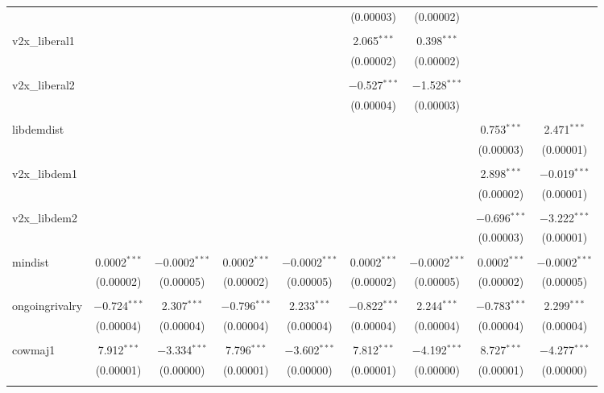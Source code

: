 \begin{table}[!htbp]
\begin{tabular}{@{\extracolsep{5pt}}lcccccccc}
  &  &  &  &  & (0.00003) & (0.00002) &  &  \\ 
  & & & & & & & & \\ 
 v2x\_liberal1 &  &  &  &  & 2.065$^{***}$ & 0.398$^{***}$ &  &  \\ 
  &  &  &  &  & (0.00002) & (0.00002) &  &  \\ 
  & & & & & & & & \\ 
 v2x\_liberal2 &  &  &  &  & $-$0.527$^{***}$ & $-$1.528$^{***}$ &  &  \\ 
  &  &  &  &  & (0.00004) & (0.00003) &  &  \\ 
  & & & & & & & & \\ 
 libdemdist &  &  &  &  &  &  & 0.753$^{***}$ & 2.471$^{***}$ \\ 
  &  &  &  &  &  &  & (0.00003) & (0.00001) \\ 
  & & & & & & & & \\ 
 v2x\_libdem1 &  &  &  &  &  &  & 2.898$^{***}$ & $-$0.019$^{***}$ \\ 
  &  &  &  &  &  &  & (0.00002) & (0.00001) \\ 
  & & & & & & & & \\ 
 v2x\_libdem2 &  &  &  &  &  &  & $-$0.696$^{***}$ & $-$3.222$^{***}$ \\ 
  &  &  &  &  &  &  & (0.00003) & (0.00001) \\ 
  & & & & & & & & \\ 
 mindist & 0.0002$^{***}$ & $-$0.0002$^{***}$ & 0.0002$^{***}$ & $-$0.0002$^{***}$ & 0.0002$^{***}$ & $-$0.0002$^{***}$ & 0.0002$^{***}$ & $-$0.0002$^{***}$ \\ 
  & (0.00002) & (0.00005) & (0.00002) & (0.00005) & (0.00002) & (0.00005) & (0.00002) & (0.00005) \\ 
  & & & & & & & & \\ 
 ongoingrivalry & $-$0.724$^{***}$ & 2.307$^{***}$ & $-$0.796$^{***}$ & 2.233$^{***}$ & $-$0.822$^{***}$ & 2.244$^{***}$ & $-$0.783$^{***}$ & 2.299$^{***}$ \\ 
  & (0.00004) & (0.00004) & (0.00004) & (0.00004) & (0.00004) & (0.00004) & (0.00004) & (0.00004) \\ 
  & & & & & & & & \\ 
 cowmaj1 & 7.912$^{***}$ & $-$3.334$^{***}$ & 7.796$^{***}$ & $-$3.602$^{***}$ & 7.812$^{***}$ & $-$4.192$^{***}$ & 8.727$^{***}$ & $-$4.277$^{***}$ \\ 
  & (0.00001) & (0.00000) & (0.00001) & (0.00000) & (0.00001) & (0.00000) & (0.00001) & (0.00000) \\ 
  & & & & & & & & \\ 

\end{tabular}
\end{table}
